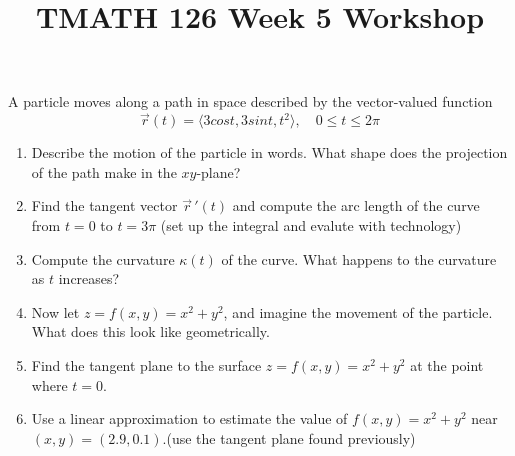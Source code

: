 \documentclass[11pt]{article}
\title{TMATH 126 Week 5 Workshop}
\author{}
\date{\vspace{-5ex}}
\newenvironment{exercise}{
    \begin{mdframed}[style=problemstyle]\textcolor{black}{}
}{
    \end{mdframed}
}
\begin{document}
\maketitle
\vspace{-5ex}%

\begin{exercise}
    A particle moves along a path in space described by the vector-valued function
    $$\vec{r}(t) = \langle 3cost, 3sint, t^{2} \rangle , \quad 0\le t \le 2\pi $$
    \begin{enumerate}[label={\alph*}]
        \item Describe the motion of the particle in words. What shape does the 
            projection of the path make in the $xy$-plane?
        \item Find the tangent vector $\vec{r}\,'(t)$ and compute the arc length 
            of the curve from $t=0$ to $t=3\pi$ (set up the integral and evalute 
            with technology)
        \item Compute the curvature $\kappa (t)$ of the curve. What happens to the
            curvature as $t$ increases?

        \item Now let $z = f(x,y) = x^{2}+y^{2}$, and imagine the movement of the
        particle. What does this look like geometrically.
        \item Find the tangent plane to the surface $z = f(x,y) =x^2+y^2$ at the point where $t=0$.
        \item Use a linear approximation to estimate  the value of $f(x,y) = x^2 + y^2$ 
            near $(x,y)=(2.9,0.1)$.(use the tangent plane found previously) 
    \end{enumerate}
\end{exercise}
\end{document}
